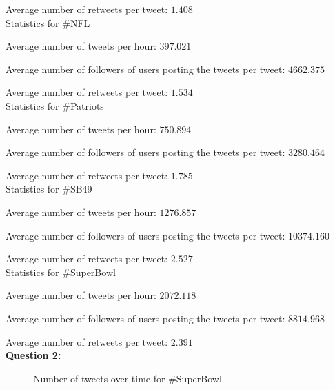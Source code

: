 \documentclass{article}
\begin{document}
Average number of retweets per tweet: $1.408$\\

Statistics for \#NFL

Average number of tweets per hour: $397.021$

Average number of followers of users posting the tweets per tweet: $4662.375$

Average number of retweets per tweet: $1.534$\\

Statistics for \#Patriots

Average number of tweets per hour: $750.894$

Average number of followers of users posting the tweets per tweet: $3280.464$

Average number of retweets per tweet: $1.785$\\

Statistics for \#SB49

Average number of tweets per hour: $1276.857$

Average number of followers of users posting the tweets per tweet: $10374.160$

Average number of retweets per tweet: $2.527$\\

Statistics for \#SuperBowl

Average number of tweets per hour: $2072.118$

Average number of followers of users posting the tweets per tweet: $8814.968$

Average number of retweets per tweet: $2.391$\\



\bigbreak
\textbf{Question 2:}

\begin{figure}
\centering
{}
\caption{Number of tweets over time for \#SuperBowl} \label{Q2_1}
\end{figure}
\end{document}
